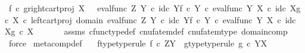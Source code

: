 \begin{isabellebody}
\ {\isachardoublequoteopen}{\isacharparenleft}{\kern0pt}f\isactrlsup {\isasymflat}\ {\isasymcirc}\isactrlsub c\ {\isasymlangle}g\isactrlsup {\isasymflat}{\isacharcomma}{\kern0pt}right{\isacharunderscore}{\kern0pt}cart{\isacharunderscore}{\kern0pt}proj\ X\ {\isasymone}{\isasymrangle}{\isacharparenright}{\kern0pt}\isactrlsup {\isasymsharp}\ {\isacharequal}{\kern0pt}\ {\isacharparenleft}{\kern0pt}{\isacharparenleft}{\kern0pt}{\isacharparenleft}{\kern0pt}eval{\isacharunderscore}{\kern0pt}func\ Z\ Y\ {\isasymcirc}\isactrlsub c\ {\isasymlangle}id\isactrlsub c\ Y{\isacharcomma}{\kern0pt}f\ {\isasymcirc}\isactrlsub c\ {\isasymbeta}\isactrlbsub Y\isactrlesub {\isasymrangle}{\isacharparenright}{\kern0pt}\ {\isasymcirc}\isactrlsub c\ eval{\isacharunderscore}{\kern0pt}func\ Y\ X\ {\isasymcirc}\isactrlsub c\ {\isasymlangle}id\isactrlsub c\ X{\isacharcomma}{\kern0pt}g\ {\isasymcirc}\isactrlsub c\ {\isasymbeta}\isactrlbsub X\isactrlesub {\isasymrangle}{\isacharparenright}{\kern0pt}\ {\isasymcirc}\isactrlsub c\ left{\isacharunderscore}{\kern0pt}cart{\isacharunderscore}{\kern0pt}proj\ {\isacharparenleft}{\kern0pt}domain\ {\isacharparenleft}{\kern0pt}{\isacharparenleft}{\kern0pt}eval{\isacharunderscore}{\kern0pt}func\ Z\ Y\ {\isasymcirc}\isactrlsub c\ {\isasymlangle}id\isactrlsub c\ Y{\isacharcomma}{\kern0pt}f\ {\isasymcirc}\isactrlsub c\ {\isasymbeta}\isactrlbsub Y\isactrlesub {\isasymrangle}{\isacharparenright}{\kern0pt}\ {\isasymcirc}\isactrlsub c\ eval{\isacharunderscore}{\kern0pt}func\ Y\ X\ {\isasymcirc}\isactrlsub c\ {\isasymlangle}id\isactrlsub c\ X{\isacharcomma}{\kern0pt}g\ {\isasymcirc}\isactrlsub c\ {\isasymbeta}\isactrlbsub X\isactrlesub {\isasymrangle}{\isacharparenright}{\kern0pt}{\isacharparenright}{\kern0pt}\ {\isasymone}{\isacharparenright}{\kern0pt}\isactrlsup {\isasymsharp}{\isachardoublequoteclose}\isanewline
\ \ \ \ \isamarkupfalse%
\ assms\ cfunc{\isacharunderscore}{\kern0pt}type{\isacharunderscore}{\kern0pt}def\ cnufatem{\isacharunderscore}{\kern0pt}def{}\ cnufatem{\isacharunderscore}{\kern0pt}type\ domain{\isacharunderscore}{\kern0pt}comp\ \isamarkupfalse%
\ force\isanewline
{}\isamarkupfalse%
%
\endisatagproof
{\isafoldproof}%
%
\isadelimproof
\isanewline
%
\endisadelimproof
\isanewline
{}\isamarkupfalse%
\ meta{\isacharunderscore}{\kern0pt}comp{}{\isacharunderscore}{\kern0pt}def{}{\isacharcolon}{\kern0pt}\isanewline
\ \ \ f{\isacharunderscore}{\kern0pt}type{\isacharbrackleft}{\kern0pt}type{\isacharunderscore}{\kern0pt}rule{\isacharbrackright}{\kern0pt}{\isacharcolon}{\kern0pt}\ {\isachardoublequoteopen}f\ {\isasymin}\isactrlsub c\ Z\isactrlbsup Y\isactrlesup {\isachardoublequoteclose}\ \ g{\isacharunderscore}{\kern0pt}type{\isacharbrackleft}{\kern0pt}type{\isacharunderscore}{\kern0pt}rule{\isacharbrackright}{\kern0pt}{\isacharcolon}{\kern0pt}\ {\isachardoublequoteopen}g\ {\isasymin}\isactrlsub c\ Y\isactrlbsup X\isactrlesup {\isachardoublequoteclose}\isanewline

\end{isabellebody}
